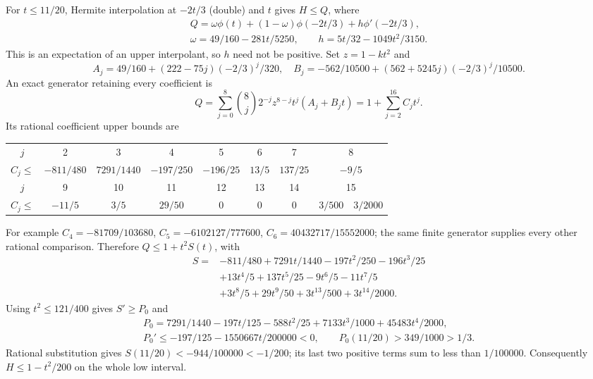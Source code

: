 For $t\le11/20$, Hermite interpolation at $-2t/3$ (double) and $t$ gives
$H\le Q$, where
\begin{gather*}
 Q=\omega\phi(t)+(1-\omega)\phi(-2t/3)+h\phi'(-2t/3),\\
 \omega=49/160-281t/5250,\qquad h=5t/32-1049t^2/3150.
\end{gather*}
This is an expectation of an upper interpolant, so $h$ need not be positive.
Set $z=1-kt^2$ and
\[
 A_j=49/160+(222-75j)(-2/3)^j/320,\quad
 B_j=-562/10500+(562+5245j)(-2/3)^j/10500.
\]
An exact generator retaining every coefficient is
\[
 Q=\sum_{j=0}^8\binom8j2^{-j}z^{8-j}t^j(A_j+B_jt)
   =1+\sum_{j=2}^{16}C_jt^j.
\]
Its rational coefficient upper bounds are
\begin{center}\small
\begin{tabular}{@{}c*{7}{c}@{}}\toprule
$j$&2&3&4&5&6&7&8\\
$C_j\le$&$-811/480$&$7291/1440$&$-197/250$&$-196/25$&$13/5$&$137/25$&$-9/5$\\\midrule
$j$&9&10&11&12&13&14&15\quad16\\
$C_j\le$&$-11/5$&$3/5$&$29/50$&$0$&$0$&$0$&$3/500\quad3/2000$\\\bottomrule
\end{tabular}
\end{center}
For example $C_4=-81709/103680$, $C_5=-6102127/777600$,
$C_6=40432717/15552000$; the same finite generator supplies every other
rational comparison. Therefore $Q\le1+t^2S(t)$, with
\begin{align*}
 S={}&-811/480+7291t/1440-197t^2/250-196t^3/25\\
 &+13t^4/5+137t^5/25-9t^6/5-11t^7/5\\
 &+3t^8/5+29t^9/50+3t^{13}/500+3t^{14}/2000.
\end{align*}
Using $t^2\le121/400$ gives $S'\ge P_0$ and
\begin{gather*}
 P_0=7291/1440-197t/125-588t^2/25+7133t^3/1000+45483t^4/2000,\\
 P_0'\le-197/125-1550667t/200000<0,\qquad P_0(11/20)>349/1000>1/3.
\end{gather*}
Rational substitution gives $S(11/20)<-944/100000<-1/200$;
its last two positive terms sum to less than $1/100000$.
Consequently $H\le1-t^2/200$ on the whole low interval.

